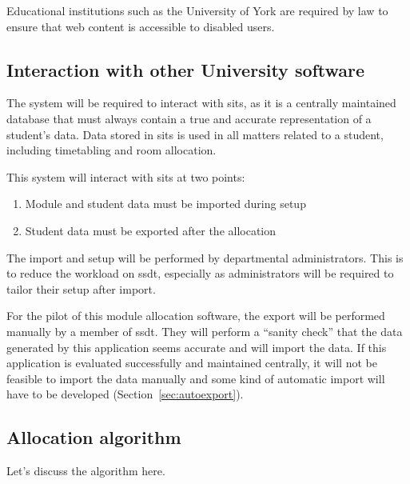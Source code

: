 \documentclass[]{scrartcl}
\begin{document}

Educational institutions such as the University of York are required by law to
ensure that web content is accessible to disabled users.


\subsection{Interaction with other University software}

The system will be required to interact with \gls{sits}, as it is a centrally
maintained database that must always contain a true and accurate
representation of a student's data. Data stored in \gls{sits} is used in all
matters related to a student, including timetabling and room allocation.

This system will interact with \gls{sits} at two points:

\begin{enumerate}
  \item Module and student data must be imported during setup
  \item Student data must be exported after the allocation
\end{enumerate}

The import and setup will be performed by departmental administrators. This is
to reduce the workload on \gls{ssdt}, especially as administrators will be
required to tailor their setup after import.

For the pilot of this module allocation software, the export will be performed
manually by a member of \gls{ssdt}. They will perform a ``sanity check'' that
the data generated by this application seems accurate and will import the
data. If this application is evaluated successfully and maintained centrally,
it will not be feasible to import the data manually and some kind of automatic
import will have to be developed (Section~\ref{sec:autoexport}).


\subsection{Allocation algorithm}

Let's discuss the algorithm here.
\end{document}
